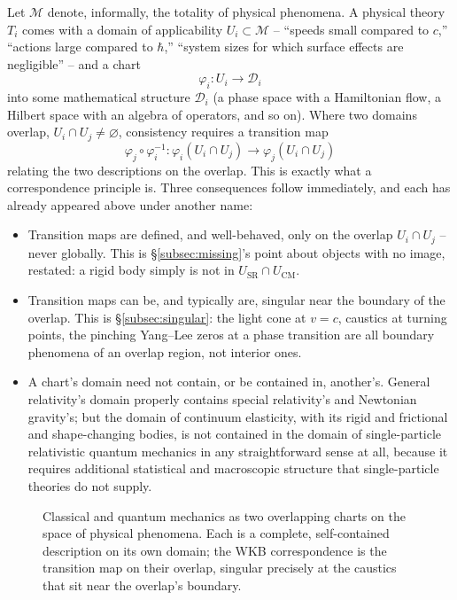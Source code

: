 Let $\mathcal{M}$ denote, informally, the totality of physical phenomena. A physical theory $T_i$ comes with a domain of applicability $U_i\subset\mathcal{M}$ -- ``speeds small compared to $c$,'' ``actions large compared to $\hbar$,'' ``system sizes for which surface effects are negligible'' -- and a chart
\[
\varphi_i : U_i \longrightarrow \mathcal{D}_i
\]
into some mathematical structure $\mathcal{D}_i$ (a phase space with a Hamiltonian flow, a Hilbert space with an algebra of operators, and so on). Where two domains overlap, $U_i\cap U_j\neq\varnothing$, consistency requires a transition map
\[
\varphi_j\circ\varphi_i^{-1} : \varphi_i(U_i\cap U_j)\longrightarrow \varphi_j(U_i\cap U_j)
\]
relating the two descriptions on the overlap. This is exactly what a correspondence principle is. Three consequences follow immediately, and each has already appeared above under another name:

\begin{itemize}
\item Transition maps are defined, and well-behaved, only on the overlap $U_i\cap U_j$ -- never globally. This is \S\ref{subsec:missing}'s point about objects with no image, restated: a rigid body simply is not in $U_{\text{SR}}\cap U_{\text{CM}}$.
\item Transition maps can be, and typically are, singular near the boundary of the overlap. This is \S\ref{subsec:singular}: the light cone at $v=c$, caustics at turning points, the pinching Yang--Lee zeros at a phase transition are all boundary phenomena of an overlap region, not interior ones.
\item A chart's domain need not contain, or be contained in, another's. General relativity's domain properly contains special relativity's and Newtonian gravity's; but the domain of continuum elasticity, with its rigid and frictional and shape-changing bodies, is not contained in the domain of single-particle relativistic quantum mechanics in any straightforward sense at all, because it requires additional statistical and macroscopic structure that single-particle theories do not supply.
\end{itemize}

\begin{figure}[h]
\centering
{}
\caption{Classical and quantum mechanics as two overlapping charts on the space of physical phenomena. Each is a complete, self-contained description on its own domain; the WKB correspondence is the transition map on their overlap, singular precisely at the caustics that sit near the overlap's boundary.}
\label{fig:atlas}
\end{figure}

